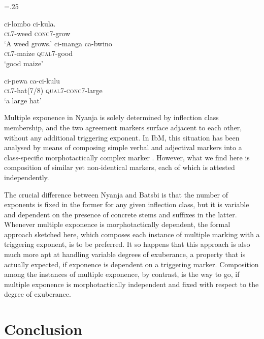 \documentclass[output=paper]{langsci/langscibook}
\begin{document}
{\multicolsep=.25\baselineskip
\begin{multicols}{2}
\begin{exe}
  \ex 
  \begin{xlist}
    \ex \label{ex:NyanjaConc} 
      \gll ci-lombo ci-kula.\\
      \textsc{cl7}-weed \textsc{conc7}-grow\\
      \glt `A weed grows.'
    \ex \label{ex:NyanjaQual} 
      \gll ci-manga ca-bwino\\
      \textsc{cl7}-maize \textsc{qual7}-good\\
      \glt `good maize'
  \end{xlist}
  \end{exe}
  \end{multicols}}
\begin{exe}
  \ex
    \gll ci-pewa ca-ci-kulu\\
    \textsc{cl7}-hat(7/8) \textsc{qual7}-\textsc{conc7}-large\\
    \glt `a large hat'
\end{exe}

Multiple exponence in Nyanja is solely determined by inflection class
membership, and the two agreement markers surface adjacent to each
other, without any additional triggering exponent. In IbM, this
situation has been analysed by means of composing simple verbal and
adjectival markers into a class-specific morphotactically complex
marker \citep{Crysmann:14:OUP}. However, what we find here is
composition of similar yet non-identical markers, each of which is
attested independently. 

The crucial difference between Nyanja and Batsbi is that the number of
exponents is fixed in the former for any given inflection class, but
it is variable and dependent on the presence of concrete stems and
suffixes in the latter. Whenever multiple exponence is
morphotactically dependent, the formal approach sketched here, which
composes each instance of multiple marking with a triggering exponent,
is to be preferred. It so happens that this approach is also much
more apt at handling variable degrees of exuberance, a property
that is actually expected, if exponence is dependent on a triggering
marker. Composition among the instances of multiple exponence, by
contrast, is the way to go, if multiple exponence is morphotactically
independent and fixed with respect to the degree  of exuberance.     

\section{Conclusion}
\end{document}
